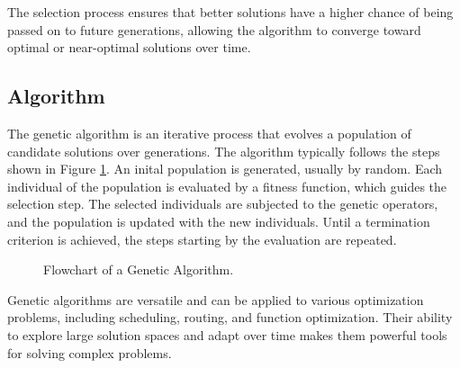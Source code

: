         The selection process ensures that better solutions have a higher chance of being passed on to future generations, allowing the algorithm to converge toward optimal or near-optimal solutions over time.

    \subsection{Algorithm}
        
        The genetic algorithm is an iterative process that evolves a population of candidate solutions over generations. 
        The algorithm typically follows the steps shown in Figure \ref{fig:ga_flowchart}.
        An inital population is generated, usually by random.
        Each individual of the population is evaluated by a fitness function, which guides the selection step.
        The selected individuals are subjected to the genetic operators, and the population is updated with the new individuals.
        Until a termination criterion is achieved, the steps starting by the evaluation are repeated.
        
        
\begin{figure}[ht]
    \centering
    \caption{Flowchart of a Genetic Algorithm.}
    \label{fig:ga_flowchart}
\end{figure}
        
        Genetic algorithms are versatile and can be applied to various optimization problems, including scheduling, routing, and function optimization. 
        Their ability to explore large solution spaces and adapt over time makes them powerful tools for solving complex problems.

